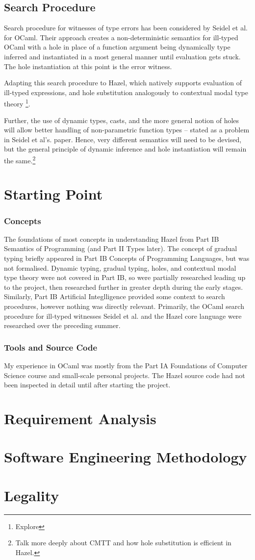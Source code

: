 \subsection{Search Procedure}
Search procedure for witnesses of type errors has been considered by Seidel et al. \cite{SearchProc} for OCaml. Their approach creates a non-deterministic semantics for ill-typed OCaml with a hole in place of a function argument being dynamically type inferred and instantiated in a most general manner until evaluation gets stuck. The hole instantiation at this point is the error witness.\par 
Adapting this search procedure to Hazel, which natively supports evaluation of ill-typed expressions, and hole substitution analogously to contextual modal type theory \cite{CMTT}\footnote{Explore}.\par 
Further, the use of dynamic types, casts, and the more general notion of holes will allow better handling of non-parametric function types -- stated as a problem in Seidel et al's. paper. Hence, very different semantics will need to be devised, but the general principle of dynamic inference and hole instantiation will remain the same.\footnote{Talk more deeply about CMTT and how hole substitution is efficient in Hazel.}

\section{Starting Point}
\subsubsection{Concepts}
The foundations of most concepts in understanding Hazel from Part IB Semantics of Programming (and Part II Types later). The concept of gradual typing briefly appeared in Part IB Concepts of Programming Languages, but was not formalised. Dynamic typing, gradual typing, holes, and contextual modal type theory were not covered in Part IB, so were partially researched leading up to the project, then researched further in greater depth during the early stages. Similarly, Part IB Artificial Integlligence provided some context to search procedures, however nothing was directly relevant. Primarily, the OCaml search procedure for ill-typed witnesses Seidel et al. \cite{SearchProc} and the Hazel core language \cite{HazelLivePaper} were researched over the preceding summer.

\subsubsection{Tools and Source Code}
My experience in OCaml was mostly from the Part IA Foundations of Computer Science course and small-scale personal projects. The Hazel source code had not been inspected in detail until after starting the project.

\section{Requirement Analysis}

\section{Software Engineering Methodology}

\section{Legality}
